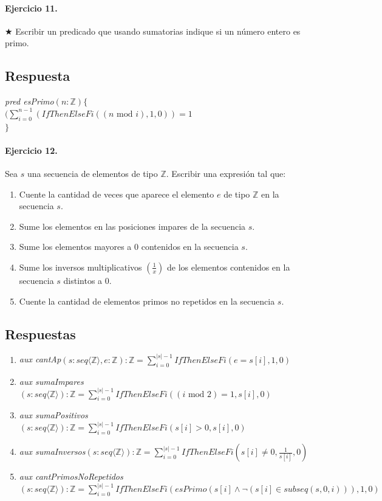 \documentclass[a4paper]{article}
\begin{document}
\paragraph{Ejercicio 11.} $\bigstar$ Escribir un predicado que usando sumatorias indique si un número entero es primo.

\subsection*{Respuesta}
\textit{pred esPrimo}$(n: \mathbb{Z})\{$\\
\hspace*{6mm}$(\sum_{i=0}^{n-1}(IfThenElseFi((n\textrm{ mod }i),1,0)) = 1 $\\
$\}$

\paragraph{Ejercicio 12.} Sea $s$ una secuencia de elementos de tipo $\mathbb{Z}$. Escribir una expresión tal que:
\begin{enumerate}[label=\alph*)]
\item Cuente la cantidad de veces que aparece el elemento $e$ de tipo $\mathbb{Z}$ en la secuencia $s$.
\item Sume los elementos en las posiciones impares de la secuencia $s$.
\item Sume los elementos mayores a 0 contenidos en la secuencia $s$.
\item Sume los inversos multiplicativos $(\frac{1}{x})$ de los elementos contenidos en la secuencia $s$ distintos a 0.
\item Cuente la cantidad de elementos primos no repetidos en la secuencia $s$.
\end{enumerate}

\subsection*{Respuestas}

\begin{enumerate}[label=\alph*)]
	\item \textit{aux cantAp}$(s:seq\langle \mathbb{Z}\rangle ,e: \mathbb{Z}):\mathbb{Z}
	= \sum_{i=0}^{|s|-1} IfThenElseFi(e=s[i],1,0)$
	\item \textit{aux sumaImpares}$(s:seq\langle \mathbb{Z}\rangle):\mathbb{Z}
	= \sum_{i=0}^{|s|-1} IfThenElseFi((i \textrm{ mod } 2)=1,s[i],0)$
	\item \textit{aux sumaPositivos}$(s:seq\langle \mathbb{Z}\rangle):\mathbb{Z}
	= \sum_{i=0}^{|s|-1} IfThenElseFi(s[i]>0,s[i],0)$
	\item \textit{aux sumaInversos}$(s:seq\langle \mathbb{Z}\rangle):\mathbb{Z}
	= \sum_{i=0}^{|s|-1} IfThenElseFi(s[i]\neq 0,\frac{1}{s[i]},0)$
	\item \textit{aux cantPrimosNoRepetidos}$(s:seq\langle \mathbb{Z}\rangle):\mathbb{Z}
	= \sum_{i=0}^{|s|-1} IfThenElseFi(esPrimo(s[i]\wedge \neg (s[i]\in subseq(s,0,i))),1,0)$
\end{enumerate}
\end{document}
